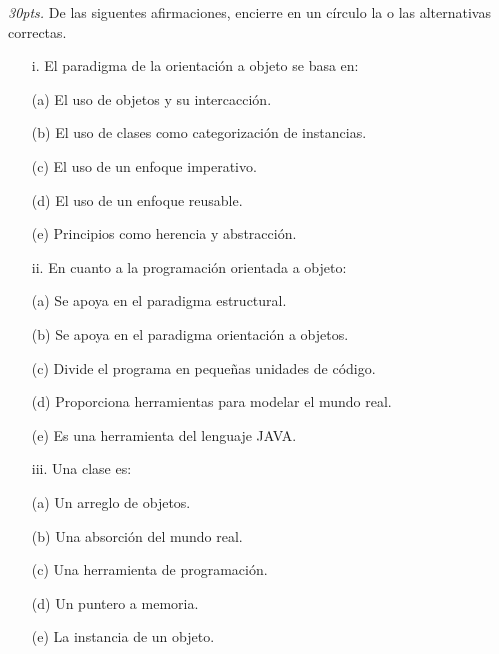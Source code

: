 \documentclass[10pt]{article}
\begin{document}
\begin{enumerate}
   {\scriptsize
    \item \emph{30pts.} De las siguentes afirmaciones, encierre en un c\'irculo la o las alternativas correctas.

    \begin{multicols}{2}

    \begin{enumerate}[label=(\alph*)]
        \item[i.] El paradigma de la orientaci\'on a objeto se basa en:
        \item[(a)] El uso de objetos y su intercacci\'on.
        \item[(b)] El uso de clases como categorizaci\'on de instancias.
        \item[(c)] El uso de un enfoque imperativo.
        \item[(d)] El uso de un enfoque reusable.
        \item[(e)] Principios como herencia y abstracci\'on.
    \end{enumerate}

    \begin{enumerate}[label=(\alph*)]
        \item[ii.] En cuanto a la programaci\'on orientada a objeto:
        \item[(a)] Se apoya en el paradigma estructural.
        \item[(b)] Se apoya en el paradigma orientaci\'on a objetos.
        \item[(c)] Divide el programa en peque\~nas unidades de c\'odigo.
        \item[(d)] Proporciona herramientas para modelar el mundo real.
        \item[(e)] Es una herramienta del lenguaje JAVA.
    \end{enumerate}

    \begin{enumerate}[label=(\alph*)]
        \item[iii.] Una clase es:
        \item[(a)] Un arreglo de objetos.
        \item[(b)] Una absorci\'on del mundo real.
        \item[(c)] Una herramienta de programaci\'on.
        \item[(d)] Un puntero a memoria.
        \item[(e)] La instancia de un objeto.
    \end{enumerate}


\end{multicols}}
\end{enumerate}
\end{document}
